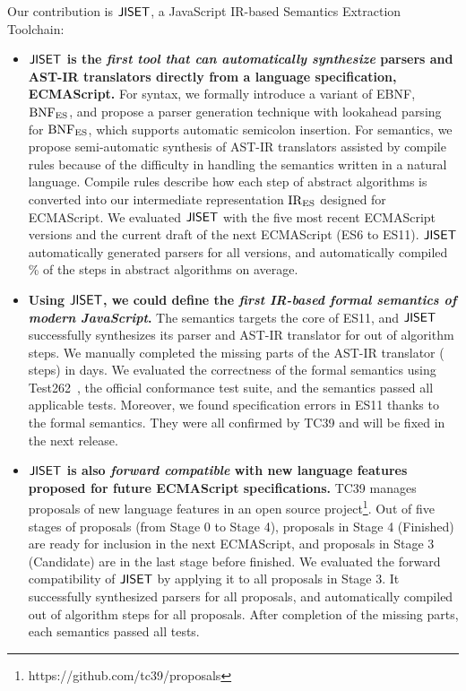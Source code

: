 Our contribution is \( \text{\sf JISET} \), a JavaScript IR-based Semantics Extraction
Toolchain:
\begin{itemize}[leftmargin=0.5cm]
  \item \textbf{\( \text{\sf JISET} \) is the \textit{first tool that can automatically synthesize}
    parsers and AST-IR translators directly from a language specification,
    ECMAScript.}  For syntax, we formally introduce a variant of EBNF, \( \text{BNF}_{\text{ES}} \),
    and propose a parser generation technique with
    lookahead parsing for \( \text{BNF}_{\text{ES}} \), which supports automatic semicolon
    insertion. For semantics, we propose semi-automatic synthesis of AST-IR
    translators assisted by compile rules because of the
    difficulty in handling the semantics written in a natural language.  Compile rules describe how
    each step of abstract algorithms is converted into our intermediate
    representation \( \text{IR}_\text{ES} \) designed for ECMAScript. We evaluated \( \text{\sf JISET} \)
    with the five most recent ECMAScript versions and the current draft of the next
    ECMAScript (ES6 to ES11).   \( \text{\sf JISET} \) automatically generated
    parsers for all versions, and automatically compiled
    \% of the steps in abstract algorithms on average.
  \item \textbf{ Using \( \text{\sf JISET} \), we could define the \textit{first IR-based
    formal semantics of modern JavaScript}.}  The semantics targets the
    core of ES11, and \( \text{\sf JISET} \) successfully synthesizes its
    parser and AST-IR translator for  out of 
    algorithm steps.  We manually completed the missing parts of the AST-IR
    translator ( steps) in  days.  We evaluated the correctness
    of the formal semantics using Test262~\cite{test262}, the official
    conformance test suite, and the semantics passed all 
    applicable tests.  Moreover, we found  specification errors in ES11
    thanks to the formal semantics.  They were all confirmed by TC39 and will be
    fixed in the next release.
  \item \textbf{\( \text{\sf JISET} \) is also \textit{forward compatible} with new language features
    proposed for future ECMAScript specifications.}  TC39 manages proposals of
    new language features in an open source
    project\footnote{https://github.com/tc39/proposals}.  Out of five stages
    of proposals (from Stage 0 to Stage 4), proposals in Stage 4 (Finished)
    are ready for inclusion in the next ECMAScript, and proposals in
    Stage 3 (Candidate) are in the last stage before finished.  We
    evaluated the forward compatibility of \( \text{\sf JISET} \) by applying it
    to all  proposals in Stage 3. It successfully
    synthesized parsers for all proposals, and automatically
    compiled  out of  algorithm steps for all
    proposals.  After completion of the missing parts,
    each semantics passed all  tests.
\end{itemize}
